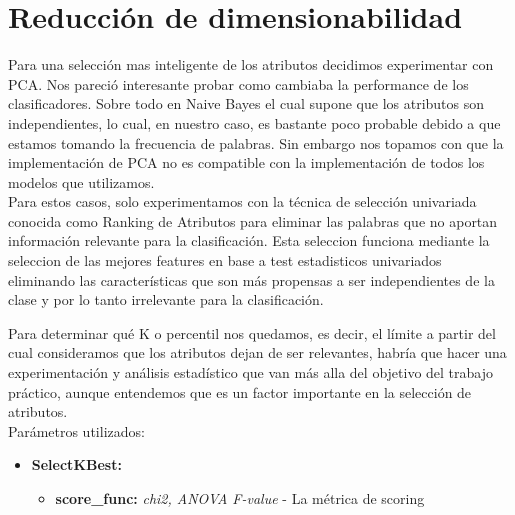 \section{Reducción de dimensionabilidad}

Para una selección mas inteligente de los atributos decidimos experimentar con PCA. Nos pareció interesante probar como cambiaba la performance de los clasificadores. Sobre todo en Naive Bayes el cual supone que los atributos son independientes, lo cual, en nuestro caso, es bastante poco probable debido a que estamos tomando la frecuencia de palabras. Sin embargo nos topamos con que la implementación de PCA no es compatible con la implementación de todos los modelos que utilizamos. \\


Para estos casos, solo experimentamos con la técnica de selección univariada conocida como Ranking de Atributos para eliminar las palabras que no aportan información relevante para la clasificación. Esta seleccion funciona mediante la seleccion de las mejores features en base a test estadisticos univariados eliminando las características que son más propensas a ser independientes de la clase y por lo tanto irrelevante para la clasificación.

Para determinar qué K o percentil nos quedamos, es decir, el límite a partir del cual consideramos que los atributos dejan de ser relevantes, habría que hacer una experimentación y análisis estadístico que van más alla del objetivo del trabajo práctico, aunque entendemos que es un factor importante en la selección de atributos. \\
  
Parámetros utilizados:

\begin{itemize}
\item \textbf{SelectKBest:} 
	\begin{itemize}
	\item \textbf{score\_func:} \textit{chi2, ANOVA F-value} - La métrica de scoring
	\end{itemize}
\end{itemize}



